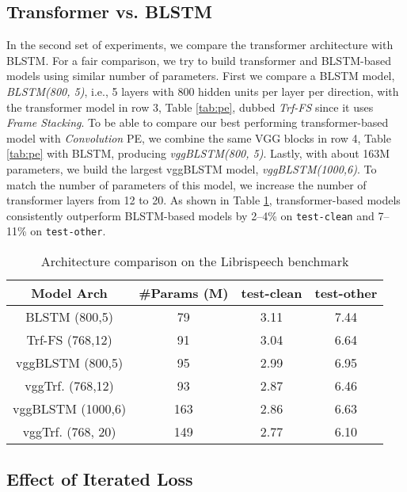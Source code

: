 \documentclass{article}
\begin{document}
\subsection{Transformer vs. BLSTM} 

In the second set of experiments, we compare the transformer architecture with BLSTM. 
For a fair comparison, we try to build transformer and BLSTM-based models using similar number of parameters. First we compare a BLSTM model, \textit{BLSTM(800, 5)}, i.e., 5 layers with 800 hidden units per layer per direction, with the transformer model in row 3, Table \ref{tab:pe}, dubbed \textit{Trf-FS} since it uses \emph{Frame Stacking}. To be able to compare our best performing transformer-based model with \emph{Convolution} PE, we combine the same VGG blocks in row 4, Table \ref{tab:pe} with BLSTM, producing \textit{vggBLSTM(800, 5)}. Lastly, with about 163M parameters, we build the largest vggBLSTM model, \textit{vggBLSTM(1000,6)}. To match the number of parameters of this model, we increase the number of transformer layers from 12 to 20. As shown in Table \ref{tab:arch}, transformer-based models consistently outperform BLSTM-based models by 2--4\% on \texttt{test-clean} and 7--11\% on \texttt{test-other}. 

\begin{table}[htb]
    \centering
    \caption{Architecture comparison on the Librispeech benchmark}
    \begin{tabular}{|c|c|cc|}
    \hline
    Model Arch     & \#Params (M) & \rm{test-clean} & \rm{test-other} \\
    \hline\hline
    BLSTM (800,5)  & 79 & 3.11 & 7.44 \\
    Trf-FS (768,12)   & 91 & 3.04 & 6.64 \\
    \hline
    vggBLSTM (800,5) & 95 & 2.99 & 6.95 \\
    vggTrf. (768,12) & 93 & 2.87 & 6.46 \\
    \hline
    vggBLSTM (1000,6) & 163 & 2.86 & 6.63 \\
    vggTrf. (768, 20) & 149 & 2.77 & 6.10 \\
    \hline
    \end{tabular}
    \label{tab:arch}
\end{table}


\subsection{Effect of Iterated Loss}\vspace{-0.5em}
\end{document}
